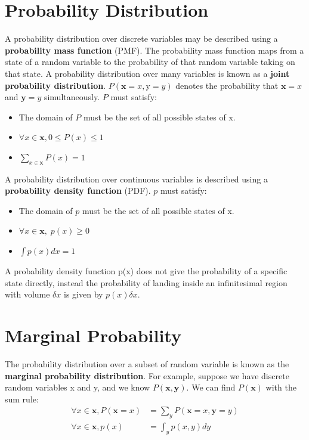 \documentclass[12pt]{report}
\begin{document}
    \section{Probability Distribution}
        A probability distribution over discrete variables may be described using a \textbf{probability mass function} (PMF).
        The probability mass function maps from a state of a random variable to the probability of that random variable taking on that state. A probability distribution over many variables is known as a \textbf{joint probability distribution}. $P(\mathbf{x} = x, \text{y} = y)$ denotes the probability that $\mathbf{x} = x$ and $\mathbf{y} = y$ simultaneously.
        $P$ must satisfy:
        \begin{itemize}
            \item The domain of $P$ must be the set of all possible states of x. 
            \item $\forall x \in \mathbf{x}, 0 \leq P(x) \leq 1$
            \item $\sum_{x \in \mathbf{x}}{P(x)} = 1$
        \end{itemize}
        
        A probability distribution over continuous variables is described using a \textbf{probability density function} (PDF). $p$ must satisfy:
        \begin{itemize}
            \item The domain of $p$ must be the set of all possible states of x.
            \item $\forall x \in \mathbf{x},\;p(x) \geq 0$
            \item $\int{p(x)dx} = 1$
        \end{itemize}
        A probability density function p(x) does not give the probability of a specific state directly, instead the probability of landing inside an infinitesimal region with volume $\delta x$ is given by $p(x)\delta x$.
    
    \section{Marginal Probability}
        The probability distribution over a subset of random variable is known as the \textbf{marginal probability distribution}. For example, suppose we have discrete random variables x and y, and we know $P(\mathbf{x}, \mathbf{y})$. We can find $P(\mathbf{x})$ with the sum rule:
        \begin{align}
            \forall x \in \mathbf{x}, P(\mathbf{x} = x) &= \sum_y{P(\mathbf{x} = x, \mathbf{y} = y)} \\
            \forall x \in \mathbf{x}, p(x) &= \int_y{p(x,y)dy}
        \end{align}
        
\end{document}
